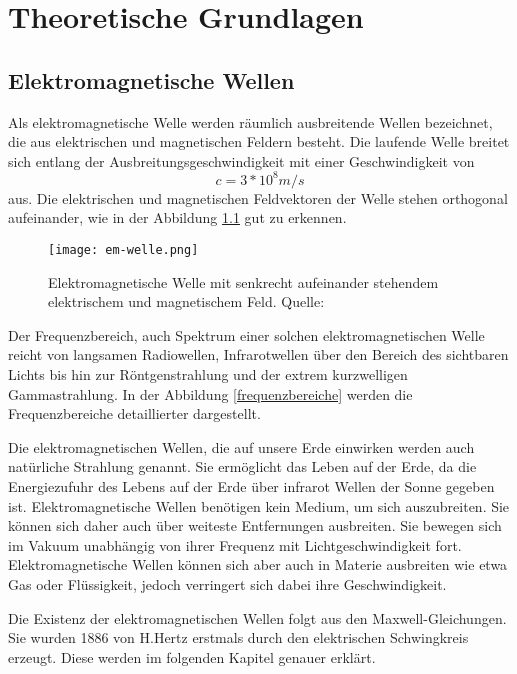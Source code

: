 
\chapter{Theoretische Grundlagen}
\section{Elektromagnetische Wellen}
Als elektromagnetische Welle werden räumlich ausbreitende Wellen bezeichnet, die aus elektrischen und magnetischen Feldern besteht. Die laufende Welle breitet sich entlang der Ausbreitungsgeschwindigkeit mit einer Geschwindigkeit von \[c= 3*10^8 m/s\] aus. Die elektrischen und magnetischen Feldvektoren der Welle stehen orthogonal aufeinander, wie in der Abbildung \ref{elektromagnetische Welle} gut zu erkennen.

\begin{figure}[ht]
	\centering
	\texttt{[image: em-welle.png]}
	\caption[Elektromagnetische Welle mit senkrecht
	aufeinander stehendem elektrischem und magnetischem Feld]{Elektromagnetische Welle mit senkrecht aufeinander stehendem elektrischem und magnetischem Feld. Quelle: \cite[Harten, S. 130]{Harten:2017}} 
	\label{elektromagnetische Welle}
\end{figure}

Der Frequenzbereich, auch Spektrum einer solchen elektromagnetischen Welle reicht von langsamen Radiowellen, Infrarotwellen über den Bereich des sichtbaren Lichts bis hin zur Röntgenstrahlung und der extrem kurzwelligen Gammastrahlung. In der Abbildung \ref{frequenzbereiche} werden die Frequenzbereiche detaillierter dargestellt.

Die elektromagnetischen Wellen, die auf unsere Erde einwirken werden auch natürliche Strahlung genannt. Sie ermöglicht das Leben auf der Erde, da die Energiezufuhr des Lebens auf der Erde über infrarot Wellen der Sonne gegeben ist.
Elektromagnetische Wellen benötigen kein Medium, um sich auszubreiten. Sie können sich daher auch über weiteste Entfernungen ausbreiten. Sie bewegen sich im Vakuum unabhängig von ihrer Frequenz mit Lichtgeschwindigkeit fort. Elektromagnetische Wellen können sich aber auch in Materie ausbreiten wie etwa Gas oder Flüssigkeit, jedoch verringert sich dabei ihre Geschwindigkeit.

Die Existenz der elektromagnetischen Wellen folgt aus den Maxwell-Gleichungen. Sie wurden 1886 von H.Hertz erstmals durch den elektrischen Schwingkreis erzeugt. Diese werden im folgenden Kapitel genauer erklärt.

